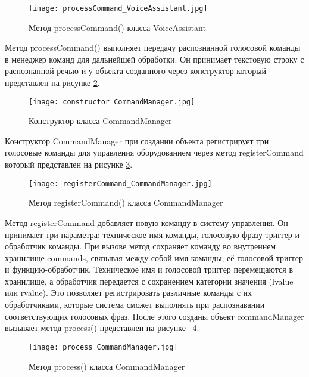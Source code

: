 \begin{figure}[H]
	\centering
	\texttt{[image: processCommand\_VoiceAssistant.jpg]}
	\caption{Метод processCommand()  класса VoiceAssistant}
	\label{fig:processCommand_VoiceAssistant}
\end{figure}

Метод processCommand() выполняет передачу распознанной голосовой команды в менеджер команд для дальнейшей обработки. Он принимает текстовую строку с распознанной речью и у объекта созданного через конструктор который представлен на рисунке \ref{fig:constructor_CommandManager}.


\begin{figure}[H]
	\centering
	\texttt{[image: constructor\_CommandManager.jpg]}
	\caption{Конструктор класса CommandManager}
	\label{fig:constructor_CommandManager}
\end{figure}

Конструктор CommandManager при создании объекта регистрирует три голосовые команды для управления оборудованием через метод registerCommand который представлен на рисунке \ref{fig:registerCommand_CommandManager}.

\begin{figure}[H]
	\centering
	\texttt{[image: registerCommand\_CommandManager.jpg]}
	\caption{Метод registerCommand()  класса CommandManager}
	\label{fig:registerCommand_CommandManager}
\end{figure}

Метод registerCommand добавляет новую команду в систему управления. Он принимает три параметра: техническое имя команды, голосовую фразу-триггер и обработчик команды. При вызове метод сохраняет команду во внутреннем хранилище commands, связывая между собой имя команды, её голосовой триггер и функцию-обработчик. Техническое имя и голосовой триггер перемещаются в хранилище, а обработчик передается с сохранением категории значения (lvalue или rvalue). Это позволяет регистрировать различные команды с их обработчиками, которые система сможет выполнять при распознавании соответствующих голосовых фраз. После этого созданы объект commandManager вызывает метод process() представлен на рисунке ~\ref{fig:process_CommandManager}.

\begin{figure}[H]
	\centering
	\texttt{[image: process\_CommandManager.jpg]}
	\caption{Метод process()  класса CommandManager}
	\label{fig:process_CommandManager}
\end{figure}

